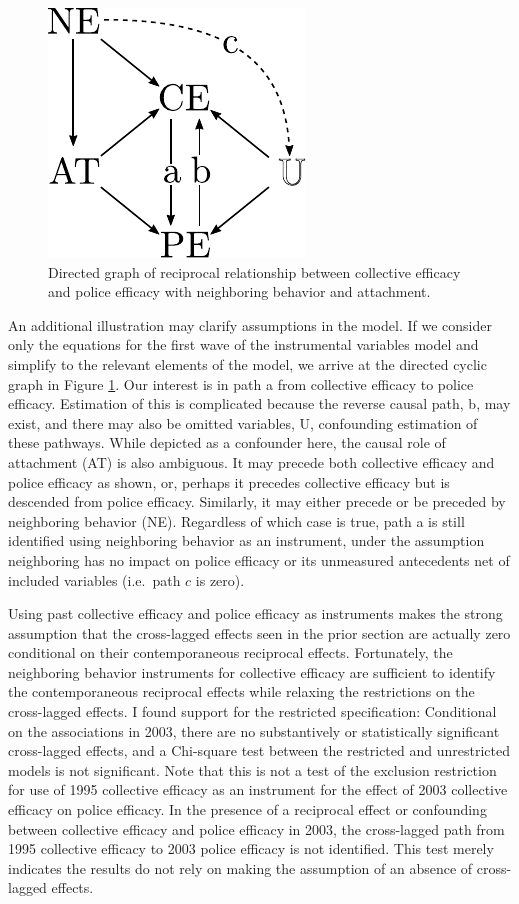 \documentclass [11pt, proquest] {uwthesis}[2015/03/03]
\begin{document}
\begin{figure}

{\centering \includegraphics[width=0.4\linewidth]{./figure/ch3/nr_dag} 

}

\caption{Directed graph of reciprocal relationship between collective efficacy and police efficacy with neighboring behavior and attachment.}\label{fig:nrdag}
\end{figure}
An additional illustration may clarify assumptions in the model. If we consider only the equations for the first wave of the instrumental variables model and simplify to the relevant elements of the model, we arrive at the directed cyclic graph in Figure \ref{fig:nrdag}. Our interest is in path a from collective efficacy to police efficacy. Estimation of this is complicated because the reverse causal path, b, may exist, and there may also be omitted variables, U, confounding estimation of these pathways. While depicted as a confounder here, the causal role of attachment (AT) is also ambiguous. It may precede both collective efficacy and police efficacy as shown, or, perhaps it precedes collective efficacy but is descended from police efficacy. Similarly, it may either precede or be preceded by neighboring behavior (NE). Regardless of which case is true, path a is still identified using neighboring behavior as an instrument, under the assumption neighboring has no impact on police efficacy or its unmeasured antecedents net of included variables (i.e.~path \(c\) is zero).

Using past collective efficacy and police efficacy as instruments makes the strong assumption that the cross-lagged effects seen in the prior section are actually zero conditional on their contemporaneous reciprocal effects. Fortunately, the neighboring behavior instruments for collective efficacy are sufficient to identify the contemporaneous reciprocal effects while relaxing the restrictions on the cross-lagged effects. I found support for the restricted specification: Conditional on the associations in 2003, there are no substantively or statistically significant cross-lagged effects, and a Chi-square test between the restricted and unrestricted models is not significant. Note that this is not a test of the exclusion restriction for use of 1995 collective efficacy as an instrument for the effect of 2003 collective efficacy on police efficacy. In the presence of a reciprocal effect or confounding between collective efficacy and police efficacy in 2003, the cross-lagged path from 1995 collective efficacy to 2003 police efficacy is not identified. This test merely indicates the results do not rely on making the assumption of an absence of cross-lagged effects.
\end{document}
